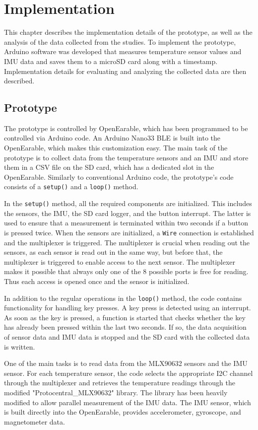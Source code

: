 \chapter{Implementation}
\label{ch:Implementation}
This chapter describes the implementation details of the prototype, as well as the analysis of the data collected from the studies.
To implement the prototype, Arduino software was developed that measures temperature sensor values and IMU data and saves them to a microSD card along with a timestamp.
Implementation details for evaluating and analyzing the collected data are then described.

\section{Prototype}
The prototype is controlled by OpenEarable, which has been programmed to be controlled via Arduino code. An Arduino Nano33 BLE is built into the OpenEarable, which makes this customization easy. The main task of the prototype is to collect data from the temperature sensors and an IMU and store them in a CSV file on the SD card, which has a dedicated slot in the OpenEarable. Similarly to conventional Arduino code, the prototype's code consists of a \texttt{setup()} and a \texttt{loop()} method.

In the \texttt{setup()} method, all the required components are initialized. This includes the sensors, the IMU, the SD card logger, and the button interrupt. The latter is used to ensure that a measurement is terminated within two seconds if a button is pressed twice. When the sensors are initialized, a \texttt{Wire} connection is established and the multiplexer is triggered. The multiplexer is crucial when reading out the sensors, as each sensor is read out in the same way, but before that, the multiplexer is triggered to enable access to the next sensor. The multiplexer makes it possible that always only one of the 8 possible ports is free for reading. Thus each access is opened once and the sensor is initialized.

In addition to the regular operations in the \texttt{loop()} method, the code contains functionality for handling key presses. A key press is detected using an interrupt. As soon as the key is pressed, a function is started that checks whether the key has already been pressed within the last two seconds. If so, the data acquisition of sensor data and IMU data is stopped and the SD card with the collected data is written.

One of the main tasks is to read data from the MLX90632 sensors and the IMU sensor. For each temperature sensor, the code selects the appropriate I2C channel through the multiplexer and retrieves the temperature readings through the modified "Protocentral\_MLX90632" library. The library has been heavily modified to allow parallel measurement of the IMU data. The IMU sensor, which is built directly into the OpenEarable, provides accelerometer, gyroscope, and magnetometer data.

